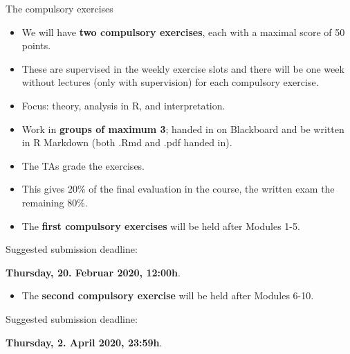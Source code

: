 \documentclass[10pt,ignorenonframetext,]{beamer}
\providecommand{\tightlist}{%
  \setlength{\itemsep}{0pt}\setlength{\parskip}{0pt}}
\begin{document}
\begin{frame}

\begin{block}{The compulsory exercises}

\begin{itemize}
\item
  We will have \textbf{two compulsory exercises}, each with a maximal
  score of 50 points.
\item
  These are supervised in the weekly exercise slots and there will be
  one week without lectures (only with supervision) for each compulsory
  exercise.
\item
  Focus: theory, analysis in R, and interpretation.
\item
  Work in \textbf{groups of maximum 3}; handed in on Blackboard and be
  written in R Markdown (both .Rmd and .pdf handed in).
\item
  The TAs grade the exercises.
\item
  This gives 20\% of the final evaluation in the course, the written
  exam the remaining 80\%.
\end{itemize}

\end{block}

\end{frame}

\begin{frame}

\begin{itemize}
\tightlist
\item
  The \textbf{first compulsory exercises} will be held after Modules
  1-5.
\end{itemize}

\hspace{8mm} Suggested submission deadline:

\hspace{8mm} \textbf{Thursday, 20. Februar 2020, 12:00h}.

\vspace{8mm}

\begin{itemize}
\tightlist
\item
  The \textbf{second compulsory exercise} will be held after Modules
  6-10.
\end{itemize}

\hspace{8mm}Suggested submission deadline:

\hspace{8mm}\textbf{Thursday, 2. April 2020, 23:59h}.

\end{frame}
\end{document}

